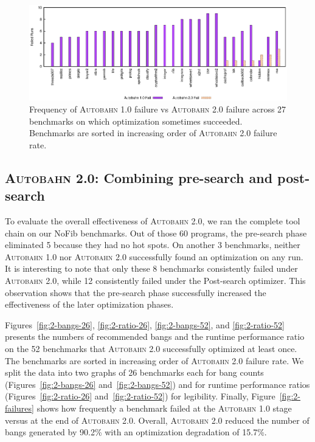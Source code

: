 \documentclass[format=sigplan, review=true, 9pt]{acmart}
\newcommand{\figref}[1]{Figure~\ref{#1}}
\newcommand{\hotspots}[0]{hot spots}
\newcommand{\Ao}[0]{\textsc{Autobahn 1.0}}
\newcommand{\At}[0]{\textsc{Autobahn 2.0}}
\newcommand{\preopt}[0]{pre-search}
\newcommand{\postopt}[0]{post-search}
\newcommand{\Postopt}[0]{Post-search}
\begin{document}
\begin{figure}
\includegraphics[width=\textwidth]{aut-post-fail}
\caption{Frequency of \Ao{} failure vs \At{} failure across 27
benchmarks on which optimization sometimes succeeded. Benchmarks are sorted in
increasing order of \At{} failure rate. } 
\label{fig:post-failures}
\end{figure}

\subsection{\At{}: Combining \preopt{} and \postopt{}}

To evaluate the overall effectiveness of \At{}, we ran the complete
tool chain on our NoFib benchmarks. Out of those 60
programs, the \preopt{} phase eliminated 5 because they had
no \hotspots{}.  On another 3 benchmarks, neither \Ao{} nor \At{} 
successfully found an optimization on any run. 
It is interesting to note that only these 8
benchmarks consistently failed under \At{}, while 12
consistently failed under the \Postopt{} optimizer. 
This observation shows that the \preopt{} phase successfully
increased the effectiveness of the later optimization phases. 

Figures~\ref{fig:2-bangs-26}, \ref{fig:2-ratio-26}, \ref{fig:2-bangs-52},
and \ref{fig:2-ratio-52} presents the numbers of recommended bangs and
the runtime performance ratio on the 52 benchmarks that \At{} 
successfully optimized at least once.
The benchmarks are sorted in increasing order of \At{} failure rate.
We split the data into two graphs of 26 benchmarks each for bang counts
(Figures~\ref{fig:2-bangs-26} and~\ref{fig:2-bangs-52})
and for runtime performance ratios
(Figures~\ref{fig:2-ratio-26} and~\ref{fig:2-ratio-52})
for legibility. 
Finally, \figref{fig:2-failures} shows how frequently a benchmark
failed at the \Ao{} stage versus at the end of \At{}. Overall, \At{}
reduced the number of bangs generated by 90.2\%
with an optimization degradation of 15.7\%.
\end{document}
